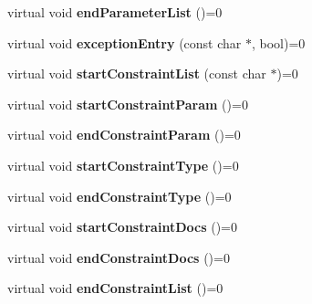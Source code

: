 \begin{DoxyCompactItemize}
\item 
\hypertarget{class_output_generator_abe288d69535956eace1c2ec800d42462}{virtual void {\bfseries end\-Parameter\-List} ()=0}\label{class_output_generator_abe288d69535956eace1c2ec800d42462}

\item 
\hypertarget{class_output_generator_a6457aaa12a5e7b0ce705ff7b0fc6ea24}{virtual void {\bfseries exception\-Entry} (const char $\ast$, bool)=0}\label{class_output_generator_a6457aaa12a5e7b0ce705ff7b0fc6ea24}

\item 
\hypertarget{class_output_generator_a2b807a9ee2395c0c9638235aaa76994d}{virtual void {\bfseries start\-Constraint\-List} (const char $\ast$)=0}\label{class_output_generator_a2b807a9ee2395c0c9638235aaa76994d}

\item 
\hypertarget{class_output_generator_ae761c551059f61fd9189f60f8bb234b3}{virtual void {\bfseries start\-Constraint\-Param} ()=0}\label{class_output_generator_ae761c551059f61fd9189f60f8bb234b3}

\item 
\hypertarget{class_output_generator_af6d0d5b31d81faa7b510ed3e3f8b5832}{virtual void {\bfseries end\-Constraint\-Param} ()=0}\label{class_output_generator_af6d0d5b31d81faa7b510ed3e3f8b5832}

\item 
\hypertarget{class_output_generator_a1c7dbf67753cdc9c3902ed6a5e681c2d}{virtual void {\bfseries start\-Constraint\-Type} ()=0}\label{class_output_generator_a1c7dbf67753cdc9c3902ed6a5e681c2d}

\item 
\hypertarget{class_output_generator_a0d7e6fe649a6087f82d0df66b2f16034}{virtual void {\bfseries end\-Constraint\-Type} ()=0}\label{class_output_generator_a0d7e6fe649a6087f82d0df66b2f16034}

\item 
\hypertarget{class_output_generator_a3a4a27be2de61a4e7398c9876cb949a0}{virtual void {\bfseries start\-Constraint\-Docs} ()=0}\label{class_output_generator_a3a4a27be2de61a4e7398c9876cb949a0}

\item 
\hypertarget{class_output_generator_a9120cf264c450a768c2c91a0d6bd0f4c}{virtual void {\bfseries end\-Constraint\-Docs} ()=0}\label{class_output_generator_a9120cf264c450a768c2c91a0d6bd0f4c}

\item 
\hypertarget{class_output_generator_a7d4c7f5b821872328c692c92f6b67d12}{virtual void {\bfseries end\-Constraint\-List} ()=0}\label{class_output_generator_a7d4c7f5b821872328c692c92f6b67d12}


\end{DoxyCompactItemize}
